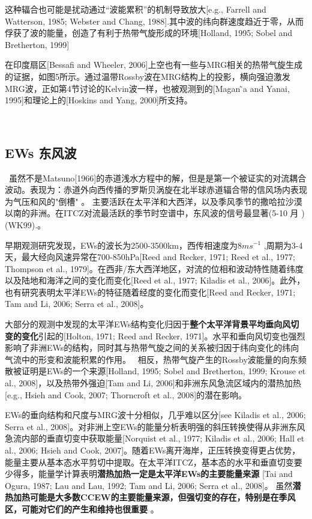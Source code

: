 \documentclass{article}
\begin{document}
\begin{CJK*}{UTF8}{gbsn}
\begin{tcolorbox}[colback=yellow!20, boxrule=0pt, sharp corners]
\textcolor{yellow!70!black}{这种辐合也可能是扰动通过“波能累积”的机制导致放大[e.g., Farrell and Watterson, 1985; Webster and Chang, 1988].其中波的纬向群速度趋近于零，从而俘获了波的能量，创造了有利于热带气旋形成的环境[Holland, 1995; Sobel and Bretherton, 1999]}
\end{tcolorbox}


在印度扇区[Bessafi and Wheeler, 2006]上空也有一些与MRG相关的热带气旋生成的证据，如图5所示。通过温带Rossby波在MRG结构上的投影，横向强迫激发MRG波，正如第4节讨论的Kelvin波一样，也被观测到的[Magan ̃a and Yanai, 1995]和理论上的[Hoskins and Yang, 2000]所支持。

\ 


\subsection*{EWs 东风波}


\ 虽然不是Matsuno[1966]的赤道浅水方程中的解，但是是第一个被证实的对流耦合波动。表现为：赤道外向西传播的罗斯贝涡旋在北半球赤道辐合带的信风场内表现为气压和风的"倒槽" 。
主要活跃在太平洋和大西洋，以及季风季节的撒哈拉沙漠以南的非洲。在ITCZ对流最活跃的季节时空谱中，东风波的信号最显著(5-10 月 )(WK99).。


早期观测研究发现，EWs的波长为2500-3500km，西传相速度为$8m s^{-1}$
,周期为3-4天，最大经向风速异常在700-850hPa[Reed and Recker, 1971; Reed et al., 1977; Thompson et al., 1979]。在西非/东大西洋地区，对流的位相和波动特性随着纬度以及陆地和海洋之间的变化而变化[Reed et al., 1977; Kiladis et al., 2006]。此外， 也有研究表明太平洋EWs的特征随着经度的变化而变化[Reed and Recker, 1971; Tam and Li, 2006; Serra et al., 2008]。


大部分的观测中发现的太平洋EWs结构变化归因于\textbf{整个太平洋背景平均垂向风切变的变化}引起的[Holton, 1971; Reed and Recker, 1971]。水平和垂向风切变也强烈影响了非洲EWs的结构，同时其与热带气旋之间的关系被归因于纬向变化的纬向气流中的形变和波能积累的作用。
\ 相反，热带气旋产生的Rossby波能量的向东频散被证明是EWs的一个来源[Holland, 1995; Sobel and Bretherton, 1999; Krouse et al., 2008]，以及热带外强迫[Tam and Li, 2006]和非洲东风急流区域内的潜热加热[e.g., Hsieh and Cook, 2007; Thorncroft et al., 2008]的潜在影响。

EWs的垂向结构和尺度与MRG波十分相似，几乎难以区分[see Kiladis et al., 2006; Serra et al., 2008]。对非洲上空EWs的能量分析表明强的斜压转换使得从非洲东风急流内部的垂直切变中获取能量[Norquist et al., 1977; Kiladis et al., 2006; Hall et al., 2006; Hsieh and Cook, 2007]。随着EWs离开海岸，正压转换变得更占优势，能量主要从基本态水平剪切中提取。在太平洋ITCZ，基本态的水平和垂直切变要少得多，能量学计算表明\textbf{潜热加热一定是太平洋EWs的主要能量来源} [Tai and Ogura, 1987; Lau and Lau, 1992; Tam and Li, 2006; Serra et al., 2008]。
虽然\textbf{潜热加热可能是大多数CCEW的主要能量来源，但强切变的存在，特别是在季风区，可能对它们的产生和维持也很重要 }。





\end{CJK*}
\end{document}
